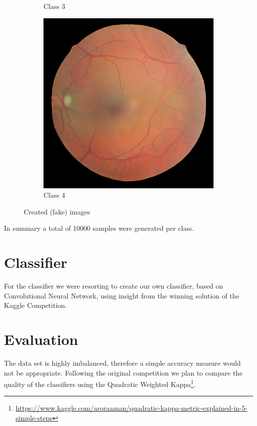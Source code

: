 \documentclass[sigconf,nonacm]{acmart}
\begin{document}
\begin{figure}[H]
\begin{subfigure}{0.18\linewidth}
\caption{Class 3}
\end{subfigure}
\begin{subfigure}{0.18\linewidth}
\centering
\includegraphics[width=0.9\linewidth]{fake-class0.png}
\caption{Class 4}
\end{subfigure}
\caption{Created (fake) images}
\label{fig:gan-fake}
\end{figure}

In summary a total of \SI{10000}{} samples were generated per class.

\section{Classifier}

For the classifier we were resorting to create our own classifier, based
on Convolutional Neural Network, using insight from the winning solution
\cite{kagglewinner}
of the Kaggle Competition.

\section{Evaluation}

The data set is highly imbalanced, therefore a simple
accuracy measure would not be appropriate.
Following the original
competition we plan to compare the quality of the classifiers
using the Quadratic Weighted
Kappa\footnote{\url{https://www.kaggle.com/aroraaman/quadratic-kappa-metric-explained-in-5-simple-steps}}.
\end{document}

